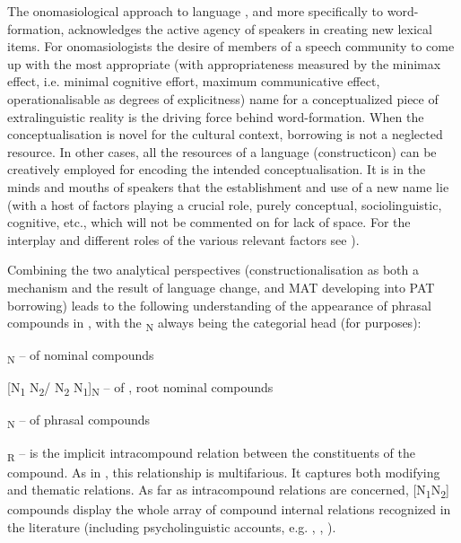 \documentclass[output=paper]{LSP/langsci}
\begin{document}
The onomasiological approach to language \citep{Štekauer1998}, and more specifically to word-formation, acknowledges the active agency of speakers in creating new lexical items. For onomasiologists the desire of members of a speech community to come up with the most appropriate (with appropriateness measured by the minimax effect, i.e. minimal cognitive effort, maximum communicative effect, operationalisable as degrees of explicitness) name for a conceptualized piece of extralinguistic reality is the driving force behind word-formation. When the conceptualisation is novel for the cultural context, borrowing is not a neglected resource. In other cases, all the resources of a language (constructicon) can be creatively employed for encoding the intended conceptualisation. It is in the minds and mouths of speakers that the establishment and use of a new name lie (with a host of factors playing a crucial role, purely conceptual, sociolinguistic, cognitive, etc., which will not be commented on for lack of space. For the interplay and different roles of the various relevant factors see \citealt{Štekauer2005}). 

Combining the two analytical perspectives (constructionalisation as both a mechanism and the result of language change, and MAT developing into PAT borrowing) leads to the following understanding of the appearance of phrasal compounds in , with the \textsubscript{N} always being the categorial head (for  purposes):


\ea\label{ex:bagasheva:bagasheva:1}
\ea\relax
[X \textsubscript{R} Y]\textsubscript{N} –  of nominal compounds

\ex 
\textsuperscript{} [N\textsubscript{1} N\textsubscript{2}/ N\textsubscript{2} N\textsubscript{1}]\textsubscript{N} –  of , root nominal compounds       

\ex{}\textsubscript{N} –  of phrasal compounds           
\z 
\z 


\textsubscript{R} – is the implicit intracompound relation between the constituents of the compound. As in , this relationship is multifarious. It captures both modifying and thematic relations. As far as intracompound relations are concerned,  [N\textsubscript{1}N\textsubscript{2}]  compounds display the whole array of compound internal relations recognized in the literature (including psycholinguistic accounts, e.g. \citealt{Bauer2013}, \citealt{GagneShoben1997}, \citealt{Ryder1994}). 
\end{document}

